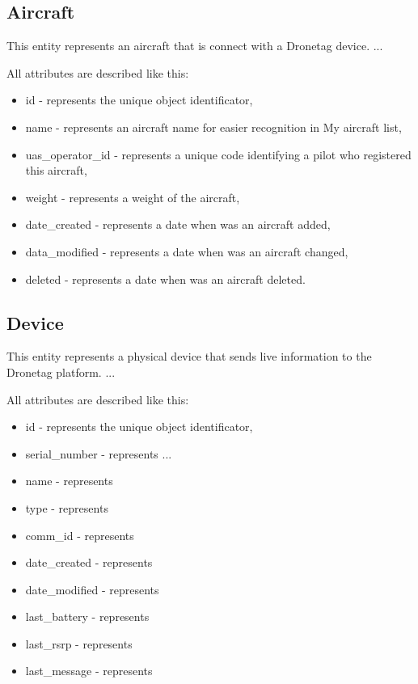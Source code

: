 \subsection{Aircraft}\label{subsec:aircraft}
This entity represents an aircraft that is connect with a Dronetag device.
...

All attributes are described like this:
\begin{itemize}
    \item id - represents the unique object identificator,
    \item name - represents an aircraft name for easier recognition in My aircraft list,
    \item uas\_operator\_id - represents a unique code identifying a pilot who registered this aircraft,
    \item weight - represents a weight of the aircraft,
    \item date\_created - represents a date when was an aircraft added,
    \item data\_modified - represents a date when was an aircraft changed,
    \item deleted - represents a date when was an aircraft deleted.
\end{itemize}

\subsection{Device}\label{subsec:device}
This entity represents a physical device that sends live information to the Dronetag platform.
...

All attributes are described like this:
\begin{itemize}
    \item id - represents the unique object identificator,
    \item serial\_number - represents ...
    \item name - represents
    \item type - represents
    \item comm\_id - represents
    \item date\_created - represents
    \item date\_modified - represents
    \item last\_battery - represents
    \item last\_rsrp - represents
    \item last\_message - represents
\end{itemize}

